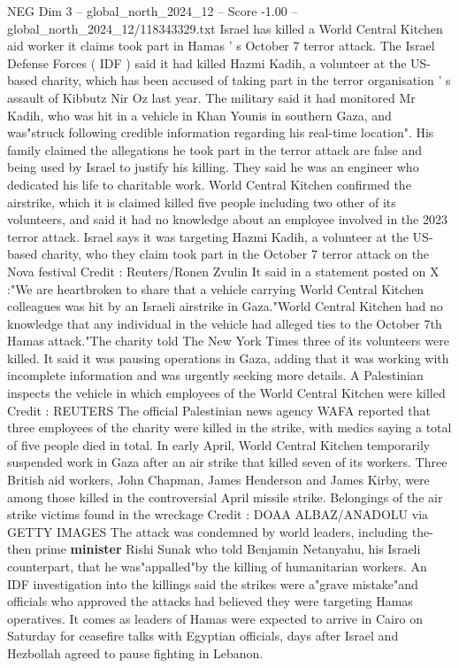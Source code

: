 \begin{textsample}{NEG Dim 3 – global\_north\_2024\_12 – Score -1.00 – global\_north\_2024\_12/118343329.txt}  \label{ex:f3_neg_223}
Israel has killed a World Central Kitchen aid worker it claims took part in Hamas ' s October 7 terror attack.
The Israel Defense Forces ( IDF ) said it had killed Hazmi Kadih, a volunteer at the US-based charity, which has been accused of taking part in the terror organisation ' s assault of Kibbutz Nir Oz last year.
The military said it had monitored Mr Kadih, who was hit in a vehicle in Khan Younis in southern Gaza, and was"struck following credible information regarding his real-time location".
His family claimed the allegations he took part in the terror attack are false and being used by Israel to justify his killing.
They said he was an engineer who dedicated his life to charitable work.
World Central Kitchen confirmed the airstrike, which it is claimed killed five people including two other of its volunteers, and said it had no knowledge about an employee involved in the 2023 terror attack.
Israel says it was targeting Hazmi Kadih, a volunteer at the US-based charity, who they claim took part in the October 7 terror attack on the Nova festival Credit : Reuters/Ronen Zvulin It said in a statement posted on X :"We are heartbroken to share that a vehicle carrying World Central Kitchen colleagues was hit by an Israeli airstrike in Gaza."World Central Kitchen had no knowledge that any individual in the vehicle had alleged ties to the October 7th Hamas attack."The charity told The New York Times three of its volunteers were killed.
It said it was pausing operations in Gaza, adding that it was working with incomplete information and was urgently seeking more details.
A Palestinian inspects the vehicle in which employees of the World Central Kitchen were killed Credit : REUTERS The official Palestinian news agency WAFA reported that three employees of the charity were killed in the strike, with medics saying a total of five people died in total.
In early April, World Central Kitchen temporarily suspended work in Gaza after an air strike that killed seven of its workers.
Three British aid workers, John Chapman, James Henderson and James Kirby, were among those killed in the controversial April missile strike.
Belongings of the air strike victims found in the wreckage Credit : DOAA ALBAZ/ANADOLU via GETTY IMAGES The attack was condemned by world leaders, including the-then prime \textbf{minister} Rishi Sunak who told Benjamin Netanyahu, his Israeli counterpart, that he was"appalled"by the killing of humanitarian workers.
An IDF investigation into the killings said the strikes were a"grave mistake"and officials who approved the attacks had believed they were targeting Hamas operatives.
It comes as leaders of Hamas were expected to arrive in Cairo on Saturday for ceasefire talks with Egyptian officials, days after Israel and Hezbollah agreed to pause fighting in Lebanon.

\end{textsample}
